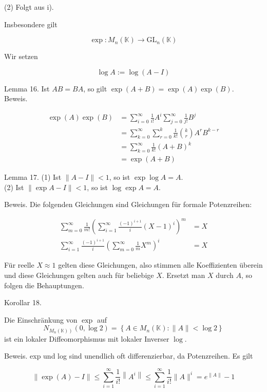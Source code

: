 \documentclass[10pt, letterpaper]{article}
\begin{document}
(2) Folgt aus i).

Insbesondere gilt

$$
\exp : M_{n}(\mathbb{K}) \rightarrow \mathrm{GL}_{n}(\mathbb{K})
$$

Wir setzen

$$
\log A:=\log (A-I)
$$

Lemma 16. Ist $A B=B A$, so gilt $\exp (A+B)=\exp (A) \exp (B)$.\\
Beweis.

$$
\begin{aligned}
\exp (A) \exp (B) & =\sum_{i=0}^{\infty} \frac{1}{i!} A^{i} \sum_{j=0}^{\infty} \frac{1}{j!} B^{j} \\
& =\sum_{k=0}^{\infty} \sum_{r=0}^{k} \frac{1}{k!}\binom{k}{r} A^{r} B^{k-r} \\
& =\sum_{k=0}^{\infty} \frac{1}{k!}(A+B)^{k} \\
& =\exp (A+B)
\end{aligned}
$$

Lemma 17. (1) Ist $\|A-I\|<1$, so ist $\exp \log A=A$.\\
(2) Ist $\|\exp A-I\|<1$, so ist $\log \exp A=A$.

Beweis. Die folgenden Gleichungen sind Gleichungen für formale Potenzreihen:

$$
\begin{aligned}
\sum_{m=0}^{\infty} \frac{1}{m!}\left(\sum_{i=1}^{\infty} \frac{(-1)^{i+1}}{i}(X-1)^{i}\right)^{m} & =X \\
\sum_{i=1}^{\infty} \frac{(-1)^{i+1}}{i}\left(\sum_{m=0}^{\infty} \frac{1}{m} X^{m}\right)^{i} & =X
\end{aligned}
$$

Für reelle $X \approx 1$ gelten diese Gleichungen, also stimmen alle Koeffizienten überein und diese Gleichungen gelten auch für beliebige $X$. Ersetzt man $X$ durch $A$, so folgen die Behauptungen.



Korollar 18. 

Die Einschränkung von $\exp$ auf
$$
N_{\left.M_{n}(\mathbb{K})\right)}(0, \log 2)=\left\{A \in M_{n}(\mathbb{K}):\|A\|<\log 2\right\}
$$
ist ein lokaler Diffeomorphismus mit lokaler Inverser $\log$.


Beweis. exp und log sind unendlich oft differenzierbar, da Potenzreihen. Es gilt

$$
\|\exp (A)-I\| \leq \sum_{i=1}^{\infty} \frac{1}{i!}\left\|A^{i}\right\| \leq \sum_{i=1}^{\infty} \frac{1}{i!}\|A\|^{i}=e^{\|A\|}-1
$$
\end{document}
